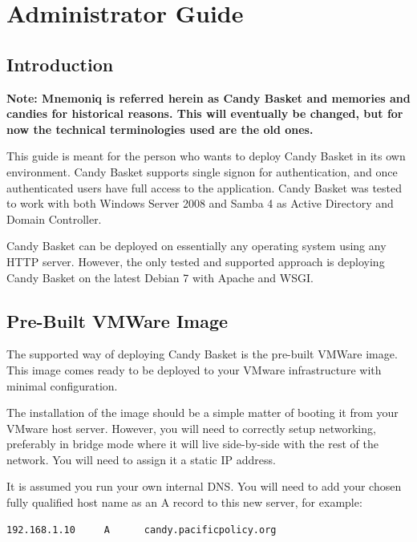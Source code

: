 \documentclass[letterpaper,10pt,english]{sphinxmanual}
\begin{document}
\chapter{Administrator Guide}
\label{administrator-guide:administrator-guide}\label{administrator-guide::doc}

\section{Introduction}
\label{administrator-guide:introduction}
\textbf{Note: Mnemoniq is referred herein as Candy Basket and memories and
candies for historical reasons. This will eventually be changed, but
for now the technical terminologies used are the old ones.}

This guide is meant for the person who wants to deploy Candy Basket in
its own environment. Candy Basket supports single signon for
authentication, and once authenticated users have full access to the
application. Candy Basket was tested to work with both Windows Server
2008 and Samba 4 as Active Directory and Domain Controller.

Candy Basket can be deployed on essentially any operating system using
any HTTP server. However, the only tested and supported approach is
deploying Candy Basket on the latest Debian 7 with Apache and WSGI.


\section{Pre-Built VMWare Image}
\label{administrator-guide:pre-built-vmware-image}
The supported way of deploying Candy Basket is the pre-built VMWare
image. This image comes ready to be deployed to your VMware
infrastructure with minimal configuration.

The installation of the image should be a simple matter of booting it
from your VMware host server. However, you will need to correctly
setup networking, preferably in bridge mode where it will live
side-by-side with the rest of the network. You will need to assign it
a static IP address.

It is assumed you run your own internal DNS. You will need to add your
chosen fully qualified host name as an A record to this new server,
for example:

\begin{Verbatim}[commandchars=\\\{\}]
192.168.1.10     A      candy.pacificpolicy.org
\end{Verbatim}
\end{document}
